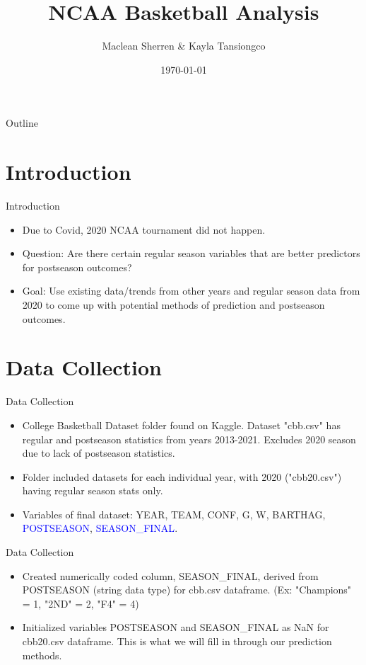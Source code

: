 \documentclass{beamer}
\title[NCAA Basketball Analysis]{NCAA Basketball Analysis}
\author[STAT 386]{Maclean Sherren \& Kayla Tansiongco}
\institute[Brigham Young University]{Brigham Young University}
\date{\today}
\begin{document}
\begin{frame}
\titlepage
\end{frame}

\begin{frame}{Outline}
\tableofcontents
\end{frame}

\section{Introduction}

\begin{frame}{Introduction}
\begin{itemize}
  \item Due to Covid, 2020 NCAA tournament did not happen.
  \item Question: Are there certain regular season variables that are better predictors for postseason outcomes?
  \item Goal: Use existing data/trends from other years and regular season data from 2020 to come up with potential methods of prediction and postseason outcomes.
\end{itemize}
\end{frame}

\section{Data Collection}

\begin{frame}{Data Collection}
\begin{itemize}
  \item College Basketball Dataset folder found on Kaggle. Dataset "cbb.csv" has regular and postseason statistics from years 2013-2021. Excludes 2020 season due to lack of postseason statistics.
  \item Folder included datasets for each individual year, with 2020 ("cbb20.csv") having regular season stats only.
  \item Variables of final dataset: YEAR, TEAM, CONF, G, W, BARTHAG, \textcolor{blue}{POSTSEASON}, \textcolor{blue}{SEASON\_FINAL}.
\end{itemize}
\end{frame}

\begin{frame}{Data Collection}
\begin{itemize}
  \item Created numerically coded column, SEASON\_FINAL, derived from POSTSEASON (string data type) for cbb.csv dataframe. (Ex: "Champions" = 1, "2ND" = 2, "F4" = 4)
  \item Initialized variables POSTSEASON and SEASON\_FINAL as NaN for cbb20.csv dataframe. This is what we will fill in through our prediction methods.
\end{itemize}
\end{frame}
\end{document}
